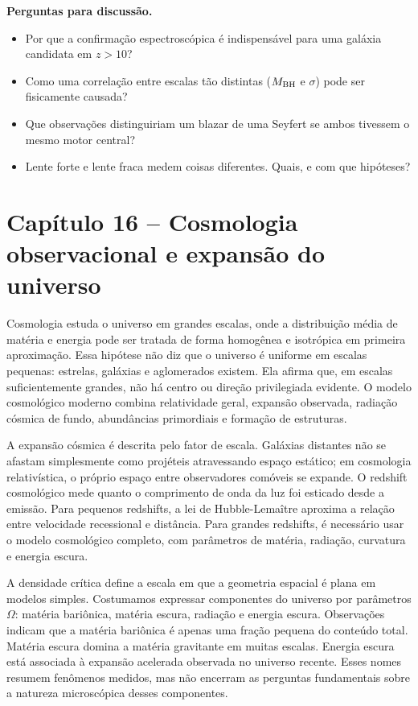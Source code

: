 \documentclass[11pt,a4paper]{article}
\begin{document}
\textbf{Perguntas para discussão.}
\begin{itemize}
\item Por que a confirmação espectroscópica é indispensável para uma galáxia candidata em $z>10$?
\item Como uma correlação entre escalas tão distintas ($M_{\rm BH}$ e $\sigma$) pode ser fisicamente causada?
\item Que observações distinguiriam um blazar de uma Seyfert se ambos tivessem o mesmo motor central?
\item Lente forte e lente fraca medem coisas diferentes. Quais, e com que hipóteses?
\end{itemize}

\newpage
\section*{Capítulo 16 -- Cosmologia observacional e expansão do universo}
Cosmologia estuda o universo em grandes escalas, onde a distribuição média de matéria e energia pode ser tratada de forma homogênea e isotrópica em primeira aproximação. Essa hipótese não diz que o universo é uniforme em escalas pequenas: estrelas, galáxias e aglomerados existem. Ela afirma que, em escalas suficientemente grandes, não há centro ou direção privilegiada evidente. O modelo cosmológico moderno combina relatividade geral, expansão observada, radiação cósmica de fundo, abundâncias primordiais e formação de estruturas.

A expansão cósmica é descrita pelo fator de escala. Galáxias distantes não se afastam simplesmente como projéteis atravessando espaço estático; em cosmologia relativística, o próprio espaço entre observadores comóveis se expande. O redshift cosmológico mede quanto o comprimento de onda da luz foi esticado desde a emissão. Para pequenos redshifts, a lei de Hubble-Lemaître aproxima a relação entre velocidade recessional e distância. Para grandes redshifts, é necessário usar o modelo cosmológico completo, com parâmetros de matéria, radiação, curvatura e energia escura.

A densidade crítica define a escala em que a geometria espacial é plana em modelos simples. Costumamos expressar componentes do universo por parâmetros $\Omega$: matéria bariônica, matéria escura, radiação e energia escura. Observações indicam que a matéria bariônica é apenas uma fração pequena do conteúdo total. Matéria escura domina a matéria gravitante em muitas escalas. Energia escura está associada à expansão acelerada observada no universo recente. Esses nomes resumem fenômenos medidos, mas não encerram as perguntas fundamentais sobre a natureza microscópica desses componentes.
\end{document}
